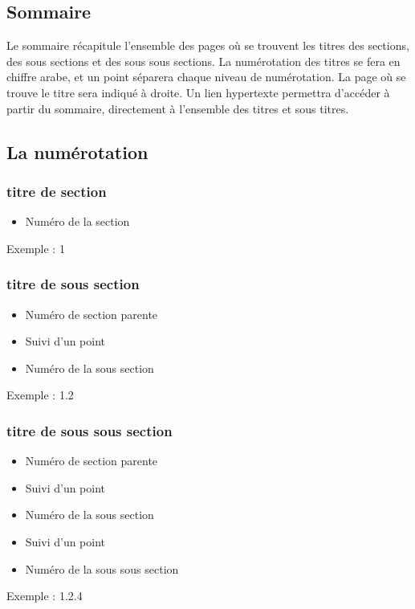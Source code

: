 \subsection{Sommaire}
  
   Le sommaire récapitule l'ensemble des pages où se trouvent les titres des sections, des sous sections et des sous sous sections.
   La numérotation des titres se fera en chiffre arabe, et un point séparera chaque niveau de numérotation.
   La page où se trouve le titre sera indiqué à droite.
   Un lien hypertexte permettra d'accéder à partir du sommaire, directement à l'ensemble des titres et sous titres.

\subsection{La numérotation}
   
   \subsubsection{titre de section}
   \begin{itemize}
        \item Numéro de la section
   \end{itemize}
        Exemple : 1

   \subsubsection{titre de sous section}
   \begin{itemize}
      \item Numéro de section parente
      \item Suivi d'un point
      \item Numéro de la sous section
   \end{itemize}
        Exemple : 1.2

   \subsubsection{titre de sous sous section}
   \begin{itemize}
      \item Numéro de section parente
      \item Suivi d'un point
      \item Numéro de la sous section
      \item Suivi d'un point
      \item Numéro de la sous sous section
   \end{itemize}
        Exemple : 1.2.4

